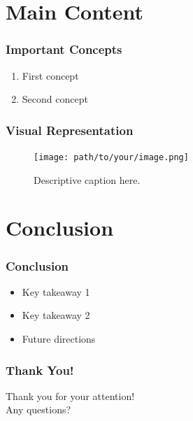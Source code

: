 \documentclass{beamer}
\begin{document}
\section{Main Content}

\begin{frame}
  \frametitle{Important Concepts}
  \begin{enumerate}
    \item First concept
    \item Second concept
  \end{enumerate}
\end{frame}

\begin{frame}
  \frametitle{Visual Representation}
  \begin{figure}
    \texttt{[image: path/to/your/image.png]}
    \caption{Descriptive caption here.}
  \end{figure}
\end{frame}

\section{Conclusion}

\begin{frame}
  \frametitle{Conclusion}
  \begin{itemize}
    \item Key takeaway 1
    \item Key takeaway 2
    \item Future directions
  \end{itemize}
\end{frame}

\begin{frame}
  \frametitle{Thank You!}
  \centering Thank you for your attention!\\
  Any questions?
\end{frame}
\end{document}
